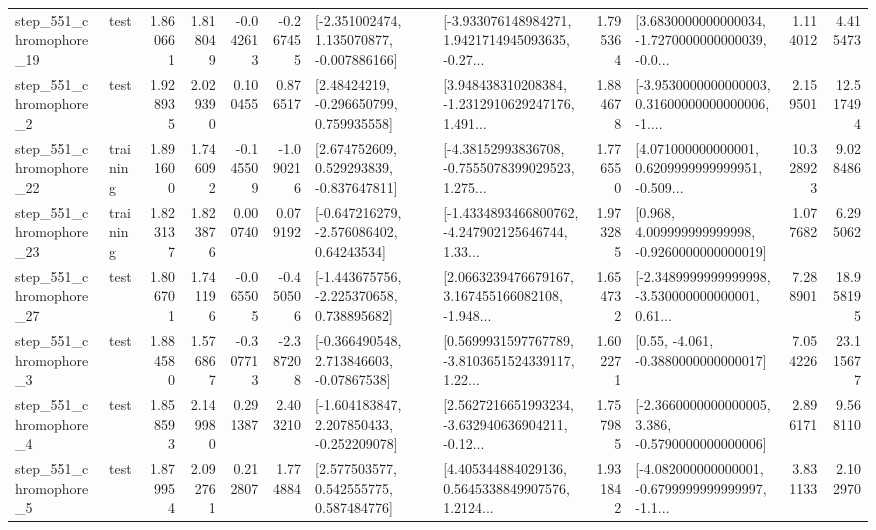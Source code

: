 \begin{tabular}{llrrrrllrlrr}
  step\_551\_chromophore\_19 &      test &      1.860661 &    1.818049 &     -0.042613 & -0.267455 &   [-2.351002474, 1.135070877, -0.007886166] &  [-3.933076148984271, 1.9421714945093635, -0.27... &       1.795364 &  [3.6830000000000034, -1.7270000000000039, -0.0... &            1.114012 &          4.415473 \\
   step\_551\_chromophore\_2 &      test &      1.928935 &    2.029390 &      0.100455 &  0.876517 &     [2.48424219, -0.296650799, 0.759935558] &  [3.948438310208384, -1.2312910629247176, 1.491... &       1.884678 &  [-3.9530000000000003, 0.31600000000000006, -1.... &            2.159501 &         12.517494 \\
  step\_551\_chromophore\_22 &  training &      1.891600 &    1.746092 &     -0.145509 & -1.090216 &    [2.674752609, 0.529293839, -0.837647811] &  [-4.38152993836708, -0.7555078399029523, 1.275... &       1.776550 &  [4.071000000000001, 0.6209999999999951, -0.509... &           10.328923 &          9.028486 \\
  step\_551\_chromophore\_23 &  training &      1.823137 &    1.823876 &      0.000740 &  0.079192 &    [-0.647216279, -2.576086402, 0.64243534] &  [-1.4334893466800762, -4.247902125646744, 1.33... &       1.973285 &    [0.968, 4.009999999999998, -0.9260000000000019] &            1.077682 &          6.295062 \\
  step\_551\_chromophore\_27 &      test &      1.806701 &    1.741196 &     -0.065505 & -0.450506 &   [-1.443675756, -2.225370658, 0.738895682] &  [2.0663239476679167, 3.167455166082108, -1.948... &       1.654732 &  [-2.3489999999999998, -3.530000000000001, 0.61... &            7.288901 &         18.958195 \\
   step\_551\_chromophore\_3 &      test &      1.884580 &    1.576867 &     -0.307713 & -2.387208 &    [-0.366490548, 2.713846603, -0.07867538] &  [0.5699931597767789, -3.8103651524339117, 1.22... &       1.602271 &                [0.55, -4.061, -0.3880000000000017] &            7.054226 &         23.115677 \\
   step\_551\_chromophore\_4 &      test &      1.858593 &    2.149980 &      0.291387 &  2.403210 &   [-1.604183847, 2.207850433, -0.252209078] &  [2.5627216651993234, -3.632940636904211, -0.12... &       1.757985 &  [-2.3660000000000005, 3.386, -0.5790000000000006] &            2.896171 &          9.568110 \\
   step\_551\_chromophore\_5 &      test &      1.879954 &    2.092761 &      0.212807 &  1.774884 &     [2.577503577, 0.542555775, 0.587484776] &  [4.405344884029136, 0.5645338849907576, 1.2124... &       1.931842 &  [-4.082000000000001, -0.6799999999999997, -1.1... &            3.831133 &          2.102970 \\

\end{tabular}
